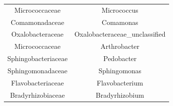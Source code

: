 \documentclass[]{article}
\begin{document}
\begin{longtable}[]{@{}cc@{}}
\begin{minipage}[t]{0.44\columnwidth}
Micrococcaceae\strut
\end{minipage} & \begin{minipage}[t]{0.46\columnwidth}\centering
Micrococcus\strut
\end{minipage}\tabularnewline
\begin{minipage}[t]{0.44\columnwidth}\centering
Comamonadaceae\strut
\end{minipage} & \begin{minipage}[t]{0.46\columnwidth}\centering
Comamonas\strut
\end{minipage}\tabularnewline
\begin{minipage}[t]{0.44\columnwidth}\centering
Oxalobacteraceae\strut
\end{minipage} & \begin{minipage}[t]{0.46\columnwidth}\centering
Oxalobacteraceae\_unclassified\strut
\end{minipage}\tabularnewline
\begin{minipage}[t]{0.44\columnwidth}\centering
Micrococcaceae\strut
\end{minipage} & \begin{minipage}[t]{0.46\columnwidth}\centering
Arthrobacter\strut
\end{minipage}\tabularnewline
\begin{minipage}[t]{0.44\columnwidth}\centering
Sphingobacteriaceae\strut
\end{minipage} & \begin{minipage}[t]{0.46\columnwidth}\centering
Pedobacter\strut
\end{minipage}\tabularnewline
\begin{minipage}[t]{0.44\columnwidth}\centering
Sphingomonadaceae\strut
\end{minipage} & \begin{minipage}[t]{0.46\columnwidth}\centering
Sphingomonas\strut
\end{minipage}\tabularnewline
\begin{minipage}[t]{0.44\columnwidth}\centering
Flavobacteriaceae\strut
\end{minipage} & \begin{minipage}[t]{0.46\columnwidth}\centering
Flavobacterium\strut
\end{minipage}\tabularnewline
\begin{minipage}[t]{0.44\columnwidth}\centering
Bradyrhizobiaceae\strut
\end{minipage} & \begin{minipage}[t]{0.46\columnwidth}\centering
Bradyrhizobium\strut

\end{minipage}
\end{longtable}
\end{document}
